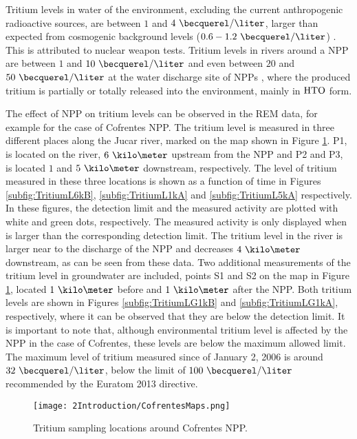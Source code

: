 Tritium levels in water of the environment, excluding the current anthropogenic radioactive sources, are between $1$ and $4~\becquerel/\liter$, larger than expected from cosmogenic background levels ($0.6-1.2~\becquerel/\liter$) \cite{FranceTritiumEnvironment}. This is attributed to nuclear weapon tests. Tritium levels in rivers around a NPP are between $1$ and $10~\becquerel/\liter$ and even between $20$ and $50~\becquerel/\liter$ at the water discharge site of NPPs \cite{FranceTritiumEnvironment}, where the produced tritium is partially or totally released into the environment, mainly in $\ce{HTO}$ form.

The effect of NPP on tritium levels can be observed in the REM data, for example for the case of Cofrentes NPP. The tritium level is measured in three different places along the Jucar river, marked on the map shown in Figure \ref{fig:SamplingLocations}. P1, is located on the river, $6~\kilo\meter$ upstream from the NPP and P2 and P3, is located $1$ and $5~\kilo\meter$ downstream, respectively. The level of tritium measured in these three locations is shown as a function of time in Figures \ref{subfig:TritiumL6kB}, \ref{subfig:TritiumL1kA} and \ref{subfig:TritiumL5kA} respectively. In these figures, the detection limit and the measured activity are plotted with white and green dots, respectively. The measured activity is only displayed when is larger than the corresponding detection limit. The tritium level in the river is larger near to the discharge of the NPP and decreases $4~\kilo\meter$ downstream, as can be seen from these data. Two additional measurements of the tritium level in groundwater are included, points S1 and S2 on the map in Figure \ref{fig:SamplingLocations}, located $1~\kilo\meter$ before and $1~\kilo\meter$ after the NPP. Both tritium levels are shown in Figures \ref{subfig:TritiumLG1kB} and \ref{subfig:TritiumLG1kA}, respectively, where it can be observed that they are below the detection limit. It is important to note that, although environmental tritium level is affected by the NPP in the case of Cofrentes, these levels are below the maximum allowed limit. The maximum level of tritium measured since of January 2, 2006 is around $32~\becquerel/\liter$, below the limit of $100~\becquerel/\liter$ recommended by the Euratom 2013 directive.

\begin{figure}[hbtp]
\texttt{[image: 2Introduction/CofrentesMaps.png]}
\centering
\caption{Tritium sampling locations around Cofrentes NPP.\label{fig:SamplingLocations}}
\end{figure}

